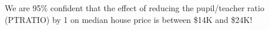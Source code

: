 \documentclass{beamer}\usepackage[]{graphicx}\usepackage[]{color}
\begin{document}
\begin{darkframes}
\begin{frame}[fragile]
        \fontsize{11}{13}\selectfont

        \pause
        We are 95\% confident that the effect of reducing the pupil/teacher ratio (PTRATIO) by 1 on median house price is between \$14K and \$24K!

        \lc
     \end{frame}



  \end{darkframes}
\end{document}
